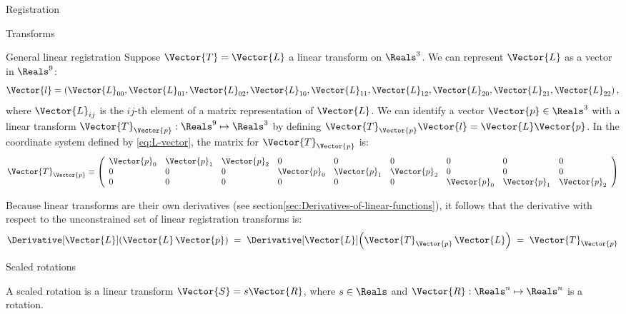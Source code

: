 \begin{plSection}{Registration}
\begin{plSection}{Transforms}
\begin{plSection}{General linear registration}
Suppose $\Vector{T} = \Vector{L}$ a linear transform on $\Reals^3$.
We can represent $\Vector{L}$ as a vector in $\Reals^9$:
\begin{equation}
\label{eq:L-vector}
\Vector{l} = \left(\Vector{L}_{00},\Vector{L}_{01},\Vector{L}_{02},
       \Vector{L}_{10},\Vector{L}_{11},\Vector{L}_{12},
       \Vector{L}_{20},\Vector{L}_{21},\Vector{L}_{22}\right),
\end{equation}
where $\Vector{L}_{ij}$ is the $ij$-th element of a
matrix representation of $\Vector{L}$.
We can identify a vector $\Vector{p} \in \Reals^3$
with a linear transform 
$\Vector{T}_{\Vector{p}} : \Reals^9 \mapsto \Reals^3$
by defining 
$\Vector{T}_{\Vector{p}}\Vector{l} = \Vector{L}\Vector{p}$.
In the coordinate system defined by \cref{eq:L-vector},
the matrix for $\Vector{T}_{\Vector{p}}$ is:
\begin{equation}
\label{eq:Tp-matrix}
\Vector{T}_{\Vector{p}} =
\left(
\begin{array}{lllllllll}
\Vector{p}_0 & \Vector{p}_1 & \Vector{p}_2 &  0   &  0   &  0   &  0   &  0   &  0 \\
 0   &  0   &  0   & \Vector{p}_0 & \Vector{p}_1 & \Vector{p}_2 &  0   &  0   &  0 \\
 0   &  0   &  0   &  0   &  0   &  0   & \Vector{p}_0 & \Vector{p}_1 & \Vector{p}_2 \\
\end{array}
\right)
\end{equation}

Because linear transforms are their own derivatives
(see section\ref{sec:Derivatives-of-linear-functions}),
it follows that the derivative with respect to the
unconstrained set of linear registration transforms is:
\begin{equation}
\label{eq:linear-transform-derivative}
\Derivative[\Vector{L}]{\left( \Vector{L} \, \Vector{p} \right)}
 \; = \;
\Derivative[\Vector{L}]{\left( \Vector{T}_{\Vector{p}} \, \Vector{L} \right)}
 \; = \;
\Vector{T}_{\Vector{p}}
\end{equation}

\end{plSection}%
\begin{plSection}{Scaled rotations}
\label{sec:Scaled-rotations}

A scaled rotation
is a linear transform $\Vector{S} = s \Vector{R}$,
where $s \in \Reals$ and $\Vector{R} : \Reals^n \mapsto \Reals^n$
is a rotation.


\end{plSection}
\end{plSection}
\end{plSection}
